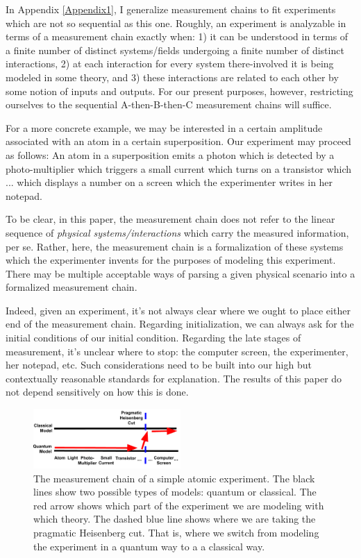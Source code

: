 \documentclass[prd,twocolumn,superscriptaddress,floatfix,amsmath,amssymb,amsfonts,nofootinbib]{revtex4-2}
\begin{document}
In Appendix \ref{Appendix1}, I generalize measurement chains to fit experiments which are not so sequential as this one. Roughly, an experiment is analyzable in terms of a measurement chain exactly when: 1) it can be understood in terms of a finite number of distinct systems/fields undergoing a finite number of distinct interactions, 2) at each interaction for every system there-involved it is being modeled in some theory, and 3) these interactions are related to each other by some notion of inputs and outputs. For our present purposes, however, restricting ourselves to the sequential A-then-B-then-C measurement chains will suffice.

For a more concrete example, we may be interested in a certain amplitude associated with an atom in a certain superposition. Our experiment may proceed as follows: An atom in a superposition emits a photon which is detected by a photo-multiplier which triggers a small current which turns on a transistor which ... which displays a number on a screen which the experimenter writes in her notepad.

To be clear, in this paper, the measurement chain does not refer to the linear sequence of \textit{physical systems/interactions} which carry the measured information, per se. Rather, here, the measurement chain is a formalization of these systems which the experimenter invents for the purposes of modeling this experiment. There may be multiple acceptable ways of parsing a given physical scenario into a formalized measurement chain. 

Indeed, given an experiment, it's not always clear where we ought to place either end of the measurement chain. Regarding initialization, we can always ask for the initial conditions of our initial condition. Regarding the late stages of measurement, it's unclear where to stop: the computer screen, the experimenter, her notepad, etc. Such considerations need to be built into our high but contextually reasonable standards for explanation. The results of this paper do not depend sensitively on how this is done.

\begin{figure}
\includegraphics[width=0.5\textwidth]{Figures/HeisenbergCut.pdf}
\caption{The measurement chain of a simple atomic experiment. The black lines show two possible types of models: quantum or classical. The red arrow shows which part of the experiment we are modeling with which theory. The dashed blue line shows where we are taking the pragmatic Heisenberg cut. That is, where we switch from modeling the experiment in a quantum way to a a classical way.}\label{FigHCut}
\end{figure}
\end{document}
